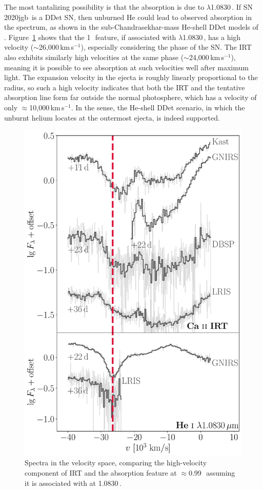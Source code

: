 \documentclass[twocolumn]{aastex631}
\newcommand{\sn}{SN\,2020jgb}
\begin{document}
The most tantalizing possibility is that the absorption is due to  $\lambda$1.0830\,\micron. If \sn\ is a DDet SN, then unburned He could lead to observed absorption in the spectrum, as shown in the sub-Chandrasekhar-mass He-shell DDet models of \citep{Boyle2017_Helium}. Figure~\ref{fig:hvf_comp} shows that the 1\,\micron\ feature, if associated with  $\lambda$1.0830\,\micron, has a high velocity ($\sim$26,000\,km\,s$^{-1}$), especially considering the phase of the SN. The  IRT also exhibits similarly high velocities at the same phase ($\sim$24,000\,km\,s$^{-1}$), meaning it is possible to see absorption at such velocities well after maximum light. The expansion velocity in the ejecta is roughly linearly proportional to the radius, so such a high velocity indicates that both the  IRT and the tentative  absorption line form far outside the normal photosphere, which has a velocity of only $\approx$10,000\,km\,s$^{-1}$. In the sense, the He-shell DDet scenario, in which the unburnt helium locates at the outermost ejecta, is indeed supported.
\begin{figure}
    \centering
    \includegraphics[width=\linewidth]{CaII_HeI_hvf.pdf}
    \caption{Spectra in the velocity space, comparing the high-velocity component of  IRT and the absorption feature at $\approx$0.99\,\micron\ assuming it is associated with  at 1.0830\,\micron.}
    \label{fig:hvf_comp}
\end{figure}
\end{document}
